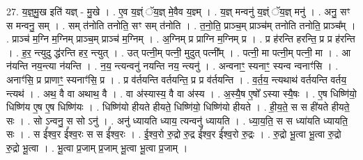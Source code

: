 \documentclass[17pt]{extarticle}
\begin{document}
27. य॒ज्ञ्॒मु॒ख इति॑ यज्ञ् - मु॒खे । . ए॒व य॒ज्ञ्ं ॅय॒ज्ञ् मे॒वैव य॒ज्ञ्म् । . य॒ज्ञ् मन्वनु॑ य॒ज्ञ्ं ॅय॒ज्ञ् मनु॑ । . अनु॒ सꣳ स मन्वनु॒ सम् । . सम् त॑नोति तनोति॒ सꣳ सम् त॑नोति । . त॒नो॒ति॒ प्राञ्च॒म् प्राञ्च॑म् तनोति तनोति॒ प्राञ्च᳚म् । . प्राञ्च॑ म॒ग्नि म॒ग्निम् प्राञ्च॒म् प्राञ्च॑ म॒ग्निम् । . अ॒ग्निम् प्र प्राग्नि म॒ग्निम् प्र । . प्र ह॑रन्ति हरन्ति॒ प्र प्र ह॑रन्ति । . ह॒र॒ न्त्युदु द्ध॑रन्ति हर॒ न्त्युत् । . उत् पत्नी॒म् पत्नी॒ मुदुत् पत्नी᳚म् । . पत्नी॒ मा पत्नी॒म् पत्नी॒ मा । . आ न॑यन्ति नय॒न्त्या न॑यन्ति । . न॒य॒ न्त्यन्वनु॑ नयन्ति नय॒ न्त्यनु॑ । . अन्वनाꣳ॒॒ स्यनाꣳ॒॒ स्यन्व न्वनाꣳ॑सि । . अनाꣳ॑सि॒ प्र प्राणाꣳ॒॒ स्यनाꣳ॑सि॒ प्र । . प्र व॑र्तयन्ति वर्तयन्ति॒ प्र प्र व॑र्तयन्ति । . व॒र्त॒य॒ न्त्यथाथ॑ वर्तयन्ति वर्तय॒ न्त्यथ॑ । . अथ॒ वै वा अथाथ॒ वै । . वा अ॑स्यास्य॒ वै वा अ॑स्य । . अ॒स्यै॒ष ए॒षो᳚ ऽस्या स्यै॒षः । . ए॒ष धिष्णि॑यो॒ धिष्णि॑य ए॒ष ए॒ष धिष्णि॑यः । . धिष्णि॑यो हीयते हीयते॒ धिष्णि॑यो॒ धिष्णि॑यो हीयते । . ही॒य॒ते॒ स स ही॑यते हीयते॒ सः । . सो ऽन्वनु॒ स सो ऽनु॑ । . अनु॑ ध्यायति ध्याय॒ त्यन्वनु॑ ध्यायति । . ध्या॒य॒ति॒ स स ध्या॑यति ध्यायति॒ सः । . स ई᳚श्व॒र ई᳚श्व॒रः स स ई᳚श्व॒रः । . ई॒श्व॒रो रु॒द्रो रु॒द्र ई᳚श्व॒र ई᳚श्व॒रो रु॒द्रः । . रु॒द्रो भू॒त्वा भू॒त्वा रु॒द्रो रु॒द्रो भू॒त्वा । . भू॒त्वा प्र॒जाम् प्र॒जाम् भू॒त्वा भू॒त्वा प्र॒जाम् । \newline
\pagebreak
{}
\end{document}
